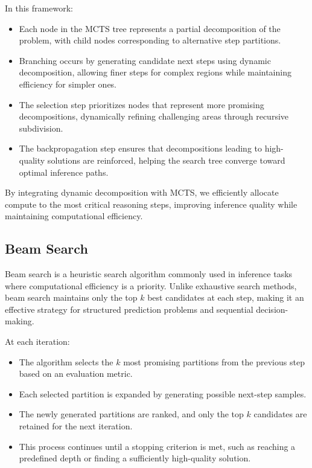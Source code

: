 In this framework:
\begin{itemize}
    \item Each node in the MCTS tree represents a partial decomposition of the problem, with child nodes corresponding to alternative step partitions.
    \item Branching occurs by generating candidate next steps using dynamic decomposition, allowing finer steps for complex regions while maintaining efficiency for simpler ones.
    \item The selection step prioritizes nodes that represent more promising decompositions, dynamically refining challenging areas through recursive subdivision.
    \item The backpropagation step ensures that decompositions leading to high-quality solutions are reinforced, helping the search tree converge toward optimal inference paths.
\end{itemize}
By integrating dynamic decomposition with MCTS, we efficiently allocate compute to the most critical reasoning steps, improving inference quality while maintaining computational efficiency.


\subsection{Beam Search}
\label{sec:beam_search}

Beam search is a heuristic search algorithm commonly used in inference tasks where computational efficiency is a priority. Unlike exhaustive search methods, beam search maintains only the top $k$ best candidates at each step, making it an effective strategy for structured prediction problems and sequential decision-making.

At each iteration:
\begin{itemize}
    \item The algorithm selects the $k$ most promising partitions from the previous step based on an evaluation metric.
    \item Each selected partition is expanded by generating possible next-step samples.
    \item The newly generated partitions are ranked, and only the top $k$ candidates are retained for the next iteration.
    \item This process continues until a stopping criterion is met, such as reaching a predefined depth or finding a sufficiently high-quality solution.
\end{itemize}

